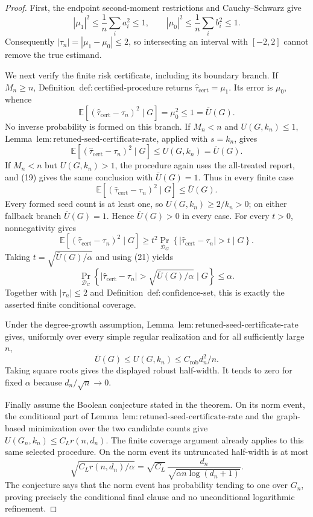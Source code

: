 \documentclass{article}
\begin{document}
\begin{proof}
First, the endpoint second-moment restrictions and Cauchy--Schwarz give
\[
|\mu_1|^2\le\frac1n\sum_i a_i^2\le1,
\qquad
|\mu_0|^2\le\frac1n\sum_i b_i^2\le1.
\]
Consequently \(|\tau_n|=|\mu_1-\mu_0|\le2\), so intersecting an interval with \([-2,2]\) cannot remove the true estimand.

We next verify the finite risk certificate, including its boundary branch.  If \(M_n\ge n\), Definition~\(\mathrm{def{:}certified\mbox{-}procedure}\) returns \(\widehat\tau_{\mathrm{cert}}=\mu_1\).  Its error is \(\mu_0\), whence
\[
\mathbb E[(\widehat\tau_{\mathrm{cert}}-\tau_n)^2\mid G]
=\mu_0^2\le1=\overline U(G).
\tag{19}
\]
No inverse probability is formed on this branch.  If \(M_n<n\) and \(U(G,k_n)\le1\), Lemma~\(\mathrm{lem{:}retuned\mbox{-}seed\mbox{-}certificate\mbox{-}rate}\), applied with \(s=k_n\), gives
\[
\mathbb E[(\widehat\tau_{\mathrm{cert}}-\tau_n)^2\mid G]
\le U(G,k_n)=\overline U(G).
\tag{20}
\]
If \(M_n<n\) but \(U(G,k_n)>1\), the procedure again uses the all-treated report, and (19) gives the same conclusion with \(\overline U(G)=1\).  Thus in every finite case
\[
\mathbb E[(\widehat\tau_{\mathrm{cert}}-\tau_n)^2\mid G]
\le\overline U(G).
\tag{21}
\]
Every formed seed count is at least one, so \(U(G,k_n)\ge2/k_n>0\); on either fallback branch \(\overline U(G)=1\).  Hence \(\overline U(G)>0\) in every case.
For every \(t>0\), nonnegativity gives
\[
\mathbb E[(\widehat\tau_{\mathrm{cert}}-\tau_n)^2\mid G]
\ge t^2\Pr_{\mathcal D_G}\!\left\{
|\widehat\tau_{\mathrm{cert}}-\tau_n|>t\mid G
\right\}.
\]
Taking \(t=\sqrt{\overline U(G)/\alpha}\) and using (21) yields
\[
\Pr_{\mathcal D_G}\!\left\{
|\widehat\tau_{\mathrm{cert}}-\tau_n|
>\sqrt{\overline U(G)/\alpha}\mid G
\right\}\le\alpha.
\]
Together with \(|\tau_n|\le2\) and Definition~\(\mathrm{def{:}confidence\mbox{-}set}\), this is exactly the asserted finite conditional coverage.

Under the degree-growth assumption, Lemma~\(\mathrm{lem{:}retuned\mbox{-}seed\mbox{-}certificate\mbox{-}rate}\) gives, uniformly over every simple regular realization and for all sufficiently large \(n\),
\[
\overline U(G)\le U(G,k_n)
\le C_{\mathrm{rob}}d_n^2/n.
\]
Taking square roots gives the displayed robust half-width.  It tends to zero for fixed \(\alpha\) because \(d_n/\sqrt n\to0\).

Finally assume the Boolean conjecture stated in the theorem.  On its norm event, the conditional part of Lemma~\(\mathrm{lem{:}retuned\mbox{-}seed\mbox{-}certificate\mbox{-}rate}\) and the graph-based minimization over the two candidate counts give
\(U(G_n,k_n)\le C_Lr(n,d_n)\).  The finite coverage argument already applies to this same selected procedure.  On the norm event its untruncated half-width is at most
\[
\sqrt{C_Lr(n,d_n)/\alpha}
=\sqrt{C_L}\,
\frac{d_n}{\sqrt{\alpha n\log(d_n+1)}}.
\]
The conjecture says that the norm event has probability tending to one over \(G_n\), proving precisely the conditional final clause and no unconditional logarithmic refinement.
\end{proof}
\end{document}

